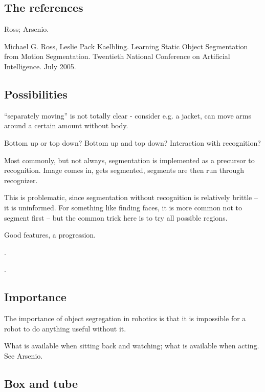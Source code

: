 \subsection{The references}

Ross; Arsenio.


Michael G. Ross, Leslie Pack Kaelbling. Learning Static Object
Segmentation from Motion Segmentation. Twentieth National Conference
on Artificial Intelligence. July 2005.

\subsection{Possibilities}

``separately moving'' is not totally clear - consider e.g. a 
jacket, can move arms around a certain amount without body.

Bottom up or top down?  Bottom up and top down?  Interaction
with recognition?

Most commonly, but not always, segmentation is implemented
as a precursor to recognition.  Image comes in, gets
segmented, segments are then run through recognizer.

This is problematic, since segmentation without
recognition is relatively brittle -- it is uninformed.
For something like finding faces, it is more common
not to segment first -- but the common trick here
is to try all possible regions.

Good features, a progression.

\cite{swain91color}.

\cite{schiele00recognition}.

\cite{lowe04distinctive}

\cite{felzenszwalb04efficient}

\subsection{Importance}

The importance of object segregation in robotics is 
that it is impossible for a robot to do anything 
useful without it.  

What is available when sitting back and watching; 
what is available when acting.  See Arsenio.



\subsection{Box and tube}



